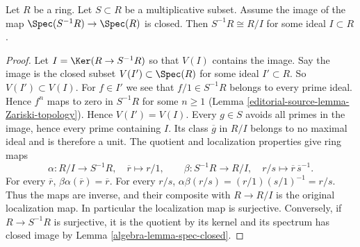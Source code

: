 \begin{lemma}
\label{editorial-source-lemma-invert-closed-quotient}
Let $R$ be a ring. Let $S \subset R$ be a multiplicative subset.
Assume the image of the map $\Spec(S^{-1}R) \to \Spec(R)$
is closed. Then $S^{-1}R \cong R/I$ for some ideal $I \subset R$.
\end{lemma}

\begin{proof}
Let $I = \Ker(R \to S^{-1}R)$ so that $V(I)$ contains the image.
Say the image is the closed subset $V(I') \subset \Spec(R)$ for
some ideal $I' \subset R$. So $V(I') \subset V(I)$.
For $f \in I'$ we see that $f/1 \in S^{-1}R$
belongs to every prime ideal. Hence $f^n$ maps to zero in $S^{-1}R$
for some $n \geq 1$ (Lemma \ref{editorial-source-lemma-Zariski-topology}).
Hence $V(I') = V(I)$.
Every $g\in S$ avoids all primes in the image, hence every prime
containing $I$. Its class $\overline g$ in $R/I$ belongs to no maximal
ideal and is therefore a unit. The quotient and localization properties
give ring maps
$$
\alpha:R/I\longrightarrow S^{-1}R,\quad \overline r\longmapsto r/1,
\qquad
\beta:S^{-1}R\longrightarrow R/I,\quad r/s\longmapsto
\overline r\,\overline s^{-1}.
$$
For every $\overline r$, $\beta\alpha(\overline r)=\overline r$.
For every $r/s$, $\alpha\beta(r/s)=(r/1)(s/1)^{-1}=r/s$.
Thus the maps are inverse, and their composite with $R\to R/I$
is the original localization map. In particular the localization map
is surjective. Conversely, if $R\to S^{-1}R$ is surjective, it is
the quotient by its kernel and its spectrum has closed image by
Lemma \ref{algebra-lemma-spec-closed}.
\end{proof}